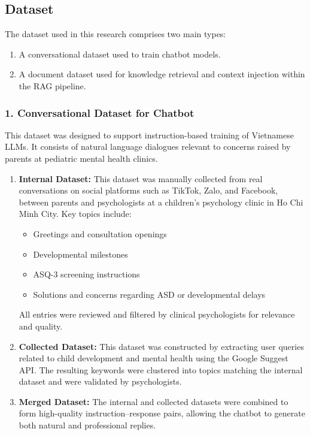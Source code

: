 \documentclass[runningheads]{llncs}
\begin{document}
\subsection{Dataset}

The dataset used in this research comprises two main types: 
\begin{enumerate}
    \item A conversational dataset used to train chatbot models.
    \item A document dataset used for knowledge retrieval and context injection within the RAG pipeline.
\end{enumerate}
\subsubsection*{1. Conversational Dataset for Chatbot}

This dataset was designed to support instruction-based training of Vietnamese LLMs. It consists of natural language dialogues relevant to concerns raised by parents at pediatric mental health clinics.

\begin{enumerate}
    \item \textbf{Internal Dataset:} This dataset was manually collected from real conversations on social platforms such as TikTok, Zalo, and Facebook, between parents and psychologists at a children's psychology clinic in Ho Chi Minh City. Key topics include:
    \begin{itemize}
        \item Greetings and consultation openings
        \item Developmental milestones
        \item ASQ-3 screening instructions
        \item Solutions and concerns regarding ASD or developmental delays
    \end{itemize}
    All entries were reviewed and filtered by clinical psychologists for relevance and quality.

    \item \textbf{Collected Dataset:} This dataset was constructed by extracting user queries related to child development and mental health using the Google Suggest API. The resulting keywords were clustered into topics matching the internal dataset and were validated by psychologists.

    \item \textbf{Merged Dataset:} The internal and collected datasets were combined to form high-quality instruction–response pairs, allowing the chatbot to generate both natural and professional replies.
\end{enumerate}
\end{document}

